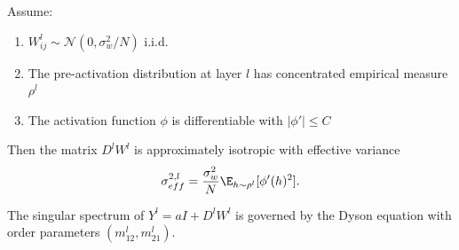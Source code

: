 \begin{proposition}\label{prop:layerwise}
Assume:
\begin{enumerate}
\item $W^l_{ij} \sim \mathcal{N}(0, \sigma_w^2/N)$ i.i.d.
\item The pre-activation distribution at layer $l$ has concentrated empirical measure $\rho^l$
\item The activation function $\phi$ is differentiable with $|\phi'| \leq C$
\end{enumerate}

Then the matrix $D^l W^l$ is approximately isotropic with effective variance
\begin{equation}
\sigma_{eff}^{2,l} = \frac{\sigma_w^2}{N} \E_{h \sim \rho^l}[\phi'(h)^2].
\end{equation}

The singular spectrum of $Y^l = aI + D^l W^l$ is governed by the Dyson equation with order parameters $(m_{12}^l, m_{21}^l)$.
\end{proposition}
